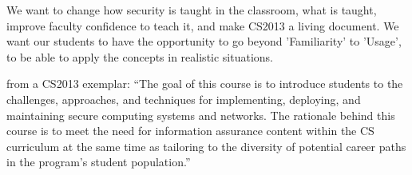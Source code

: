 We want to change how security is taught in the classroom, what is taught, improve 
faculty confidence to teach it, and make CS2013 a living document.  We want our students to 
have the opportunity to go beyond 
'Familiarity' to 'Usage', to be able to apply the concepts in realistic situations.


\noindent from a CS2013 exemplar: ``The goal of this course is to introduce students to the challenges, approaches, and techniques 
for implementing, deploying, and maintaining secure computing systems and networks. The rationale behind this 
course is to meet the
need for information assurance content within the CS curriculum at the same time as tailoring to the diversity of
potential career paths in the program's student population.''
